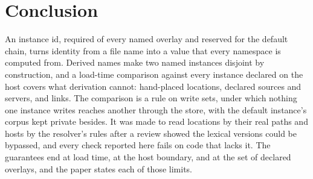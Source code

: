 \documentclass[11pt]{article}
\theoremstyle{plain}
\theoremstyle{definition}
\theoremstyle{remark}
\begin{document}
\section{Conclusion}
An instance id, required of every named overlay and reserved for the default chain, turns identity
from a file name into a value that every namespace is computed from. Derived names make two named
instances disjoint by construction, and a load-time comparison against every instance declared on
the host covers what derivation cannot: hand-placed locations, declared sources and servers, and
links. The comparison is a rule on write sets, under which nothing one instance writes reaches
another through the store, with the default instance's corpus kept private besides. It was made to
read locations by their real paths and hosts by the resolver's rules after a review showed the
lexical versions could be bypassed, and every check reported here fails on code that lacks it. The
guarantees end at load time, at the host boundary, and at the set of declared overlays, and the
paper states each of those limits.



\end{document}
